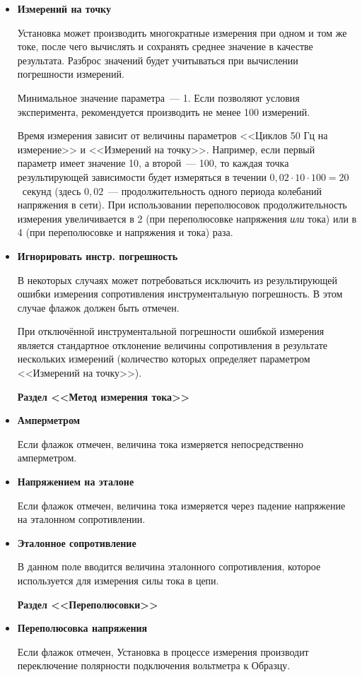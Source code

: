 \documentclass[12pt, a4paper, twocolumn]{report}
\newcommand{\PARAM}[1]{\item {\bf #1} }
\newcommand{\PARAMSECTION}[1]{\vbox{}{\bf Раздел <<#1>>}}
\begin{document}
\begin{itemize}
\PARAM{Измерений на точку}

Установка может производить многократные измерения при одном и том же токе, после чего вычислять и сохранять среднее значение в качестве результата. Разброс значений будет учитываться при вычислении погрешности измерений.

Минимальное значение параметра~--- 1. Если позволяют условия эксперимента, рекомендуется производить не менее 100 измерений.

Время измерения зависит от величины параметров <<Циклов 50 Гц на измерение>> и <<Измерений на точку>>. Например, если первый параметр имеет значение 10, а второй~--- 100, то каждая точка результирующей зависимости будет измеряться в течении $0,02 \cdot 10 \cdot 100 = 20$~секунд (здесь $0,02$~--- продолжительность одного периода колебаний напряжения в сети). При использовании переполюсовок продолжительность измерения увеличивается в 2 (при переполюсовке напряжения \emph{или} тока) или в 4 (при переполюсовке и напряжения и тока) раза.

\PARAM{Игнорировать инстр. погрешность}

В некоторых случаях может потребоваться исключить из результирующей ошибки измерения сопротивления инструментальную погрешность. В этом случае флажок должен быть отмечен.

При отключённой инструментальной погрешности ошибкой измерения является стандартное отклонение величины сопротивления в результате нескольких измерений (количество которых определяет параметром <<Измерений на точку>>).

\PARAMSECTION{Метод измерения тока}

\PARAM{Амперметром}

Если флажок отмечен, величина тока измеряется непосредственно амперметром.

\PARAM{Напряжением на эталоне}

Если флажок отмечен, величина тока измеряется через падение напряжение на эталонном сопротивлении.

\PARAM{Эталонное сопротивление}

В данном поле вводится величина эталонного сопротивления, которое используется для измерения силы тока в цепи.

\PARAMSECTION{Переполюсовки}

\PARAM{Переполюсовка напряжения}

Если флажок отмечен, Установка в процессе измерения производит переключение полярности подключения вольтметра к Образцу.


\end{itemize}
\end{document}
